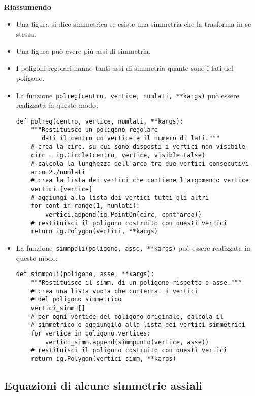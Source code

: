 \textbf{Riassumendo}
\begin{itemize} [noitemsep]
\item Una figura si dice simmetrica se esiste una simmetria che la trasforma in
se stessa.
\item Una figura può avere più assi di simmetria.
\item I poligoni regolari hanno tanti assi di simmetria quante sono i lati del
poligono.
\item La funzione~\lstinline{polreg(centro, vertice, numlati, **kargs)} può 
essere
realizzata in questo modo:

\begin{lstlisting}
def polreg(centro, vertice, numlati, **kargs):
    """Restituisce un poligono regolare 
       dati il centro un vertice e il numero di lati."""
    # crea la circ. su cui sono disposti i vertici non visibile
    circ = ig.Circle(centro, vertice, visible=False)
    # calcola la lunghezza dell'arco tra due vertici consecutivi
    arco=2./numlati
    # crea la lista dei vertici che contiene l'argomento vertice
    vertici=[vertice]
    # aggiungi alla lista dei vertici tutti gli altri
    for cont in range(1, numlati):
        vertici.append(ig.PointOn(circ, cont*arco))
    # restituisci il poligono costruito con questi vertici
    return ig.Polygon(vertici, **kargs)
\end{lstlisting}
\item La funzione~\lstinline{simmpoli(poligono, asse, **kargs)} può essere
realizzata in questo modo:

\begin{lstlisting}
def simmpoli(poligono, asse, **kargs):
    """Restituisce il simm. di un poligono rispetto a asse."""
    # crea una lista vuota che conterra' i vertici
    # del poligono simmetrico
    vertici_simm=[]
    # per ogni vertice del poligono originale, calcola il 
    # simmetrico e aggiungilo alla lista dei vertici simmetrici
    for vertice in poligono.vertices:
        vertici_simm.append(simmpunto(vertice, asse))
    # restituisci il poligono costruito con questi vertici
    return ig.Polygon(vertici_simm, **kargs)
\end{lstlisting}

\end{itemize}


\subsection{Equazioni di alcune simmetrie assiali}

